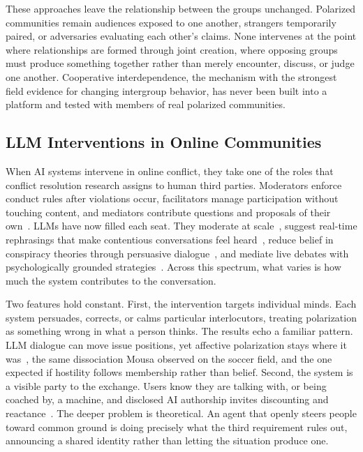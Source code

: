 \documentclass[manuscript,screen,review,anonymous]{acmart}
\begin{document}
These approaches leave the relationship between the groups unchanged.
Polarized communities remain audiences exposed to one another, strangers
temporarily paired, or adversaries evaluating each other's claims. None
intervenes at the point where relationships are formed through joint
creation, where opposing groups must produce something together rather than
merely encounter, discuss, or judge one another. Cooperative interdependence,
the mechanism with the strongest field evidence for changing intergroup
behavior, has never been built into a platform and tested with members of
real polarized communities.

\subsection{LLM Interventions in Online Communities}

When AI systems intervene in online conflict, they take one of the roles that
conflict resolution research assigns to human third parties. Moderators
enforce conduct rules after violations occur, facilitators manage
participation without touching content, and mediators contribute questions
and proposals of their own~\cite{moore2014}. LLMs have now filled each seat.
They moderate at scale~\cite{gilardi2023}, suggest real-time rephrasings that
make contentious conversations feel heard~\cite{argyle2023}, reduce belief in
conspiracy theories through persuasive dialogue~\cite{costello2024}, and
mediate live debates with psychologically grounded
strategies~\cite{tessler2024}. Across this spectrum, what varies is how much
the system contributes to the conversation.

Two features hold constant. First, the intervention targets individual minds.
Each system persuades, corrects, or calms particular interlocutors, treating
polarization as something wrong in what a person thinks. The results echo a
familiar pattern. LLM dialogue can move issue positions, yet affective
polarization stays where it was~\cite{costello2024, tessler2024}, the same
dissociation Mousa observed on the soccer field, and the one expected if
hostility follows membership rather than belief. Second, the system is a
visible party to the exchange. Users know they are talking with, or being
coached by, a machine, and disclosed AI authorship invites discounting and
reactance~\cite{jakesch2019}. The deeper problem is theoretical. An agent
that openly steers people toward common ground is doing precisely what the
third requirement rules out, announcing a shared identity rather than letting
the situation produce one.
\end{document}
